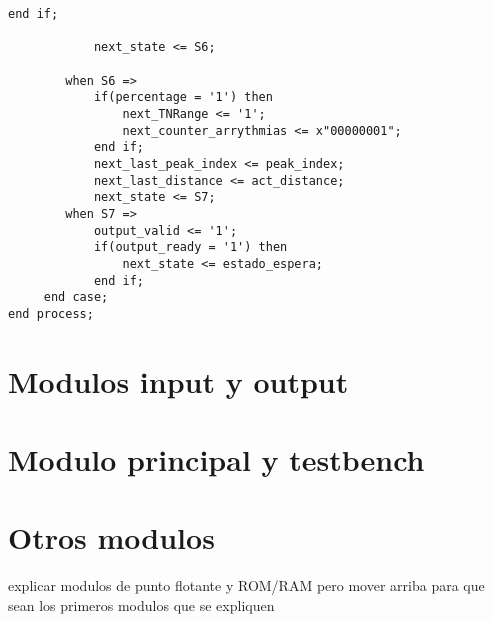 \begin{lstlisting}[frame=single]
            end if;            
 
            next_state <= S6;

        when S6 => 
            if(percentage = '1') then
                next_TNRange <= '1';
                next_counter_arrythmias <= x"00000001";
            end if; 
            next_last_peak_index <= peak_index;
            next_last_distance <= act_distance;
            next_state <= S7;
        when S7 =>          
            output_valid <= '1';
            if(output_ready = '1') then 
                next_state <= estado_espera;
            end if;
     end case;
end process;
\end{lstlisting}

\section {Modulos input y output}

\section{Modulo principal y testbench}


\section{Otros modulos} 

explicar modulos de punto flotante y ROM/RAM pero mover
arriba para que sean los primeros modulos que se expliquen



